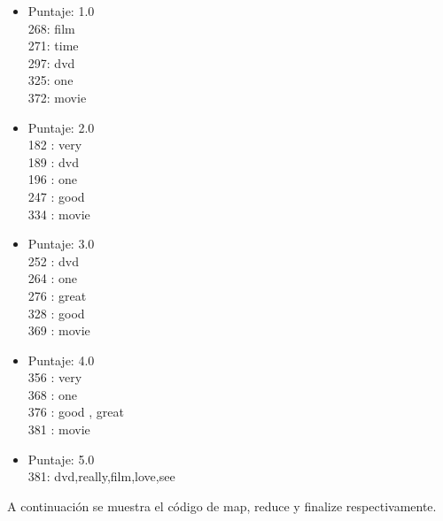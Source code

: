 \documentclass{article}
\begin{document}
\begin{itemize}
\item Puntaje: 1.0 \\
268: film \\
271: time \\
297: dvd \\
325: one \\
372: movie 

\item Puntaje: 2.0 \\
182 : very \\
189 : dvd \\
196 : one \\
247 : good \\
334 : movie

\item Puntaje: 3.0 \\
252 : dvd \\
264 : one \\
276 : great \\
328 : good \\
369 : movie

\item Puntaje: 4.0 \\
356  : very \\
368  : one \\
376  : good , great \\ 
381  : movie

\item Puntaje: 5.0 \\
381: dvd,really,film,love,see
\end{itemize}
A continuaci\'on se muestra el c\'odigo de map, reduce y finalize respectivamente.
\end{document}
